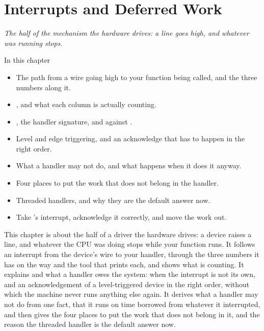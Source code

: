
\chapter{Interrupts and Deferred Work}
\label{c8:ch}

{\large\itshape The half of the mechanism the hardware drives: a line goes high, and whatever was
running stops.\par}

\begin{chapterbox}{In this chapter}
\begin{itemize}
  \item The path from a wire going high to your function being called, and the three numbers along
    it.
  \item {}, and what each column is actually counting.
  \item {}, the handler signature, and  against .
  \item Level and edge triggering, and an acknowledge that has to happen in the right order.
  \item What a handler may not do, and what happens when it does it anyway.
  \item Four places to put the work that does not belong in the handler.
  \item Threaded handlers, and why they are the default answer now.
  \item Take 's interrupt, acknowledge it correctly, and move the work out.
\end{itemize}
\end{chapterbox}

This chapter is about the half of a driver the hardware drives: a device raises a line, and whatever
the CPU was doing stops while your function runs. It follows an interrupt from the device's wire to
your handler, through the three numbers it has on the way and the tool that prints each, and shows
what  is counting. It explains  and what a handler owes the
system:  when the interrupt is not its own, and an acknowledgement of a
level-triggered device in the right order, without which the machine never runs anything else
again. It derives what a handler may not do from one fact, that it runs on time borrowed from
whatever it interrupted, and then gives the four places to put the work that does not belong in it,
and the reason the threaded handler is the default answer now.

